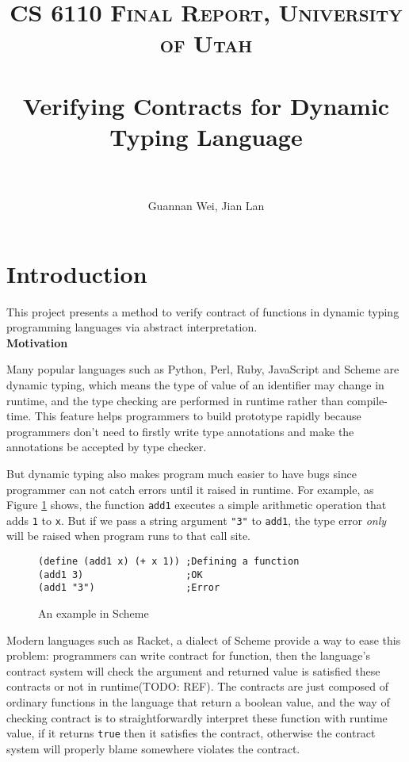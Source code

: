 \documentclass[paper=a4, fontsize=11pt]{scrartcl} %
\title{	
\normalfont \normalsize 
\textsc{CS 6110 Final Report, University of Utah} \\ [25pt] %
\horrule{0.5pt} \\[0.4cm] %
\huge Verifying Contracts for Dynamic Typing Language \\ %
\horrule{2pt} \\[0.5cm] %
}
\author{Guannan Wei, Jian Lan} %
\numberwithin{equation}{section} %
\numberwithin{figure}{section} %
\numberwithin{table}{section} %
\begin{document}
\maketitle %

\section{Introduction}

This project presents a method to verify contract of functions in dynamic typing programming languages via abstract interpretation. \\

\textbf{Motivation}

Many popular languages such as Python, Perl, Ruby, JavaScript and Scheme are dynamic typing, which means the type of value of an identifier may change in runtime, and the type checking are performed in runtime rather than compile-time. This feature helps programmers to build prototype rapidly because programmers don't need to firstly write type annotations and make the annotations be accepted by type checker.

But dynamic typing also makes program much easier to have bugs since programmer can not catch errors until it raised in runtime. For example, as Figure \ref{fig:example} shows, the function \texttt{add1} executes a simple arithmetic operation that adds \texttt{1} to \texttt{x}. But if we pass a string argument \texttt{"3"} to \texttt{add1}, the type error \textit{only} will be raised when program runs to that call site.

\begin{figure}[h!]
\lstset{language=Lisp}
\begin{lstlisting}[frame=single]
(define (add1 x) (+ x 1)) ;Defining a function
(add1 3)                  ;OK
(add1 "3")                ;Error
\end{lstlisting} 
\caption{An example in Scheme}
\label{fig:example}
\end{figure}

Modern languages such as Racket, a dialect of Scheme provide a way to ease this problem: programmers can write contract for function, then the language's contract system will check the argument and returned value is satisfied these contracts or not in runtime(TODO: REF). The contracts are just composed of ordinary functions in the language that return a boolean value, and the way of checking contract is to straightforwardly interpret these function with runtime value, if it returns \texttt{true} then it satisfies the contract, otherwise the contract system will properly blame somewhere violates the contract.
\end{document}
